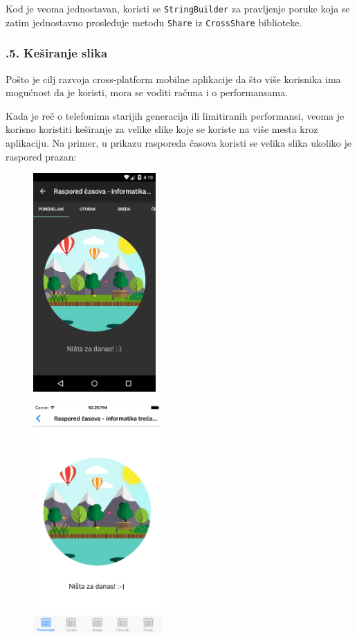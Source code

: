 \documentclass[a4paper]{article}
\begin{document}
Kod je veoma jednostavan, koristi se
\texttt{\textcolor[rgb]{0.0,0.4,0.8}{StringBuilder}} za pravljenje
poruke koja se zatim jednostavno prosleđuje metodu
\texttt{\textcolor[rgb]{0.0,0.4,0.8}{Share}} iz
\texttt{\textcolor[rgb]{0.0,0.4,0.8}{CrossShare}} biblioteke.

\subsubsection[7.10.5. Keširanje slika]{.5. Keširanje
slika}
\hypertarget{RefHeadingToc885882405265}{}Pošto je cilj razvoja
cross-platform mobilne aplikacije da što više korisnika ima mogućnost
da je koristi, mora se voditi računa i o performansama. 

Kada je reč o telefonima starijih generacija ili limitiranih
performansi, veoma je korisno koristiti keširanje za velike slike koje
se koriste na više mesta kroz aplikaciju. Na primer, u prikazu
rasporeda časova koristi se velika slika ukoliko je raspored prazan:



\begin{figure}
\centering
\includegraphics[width=46.92mm,height=83.5mm]{msc-img76.png}
\end{figure}
\begin{figure}
\centering
\includegraphics[width=48.98mm,height=87.14mm]{msc-img77.png}
\end{figure}
\end{document}
